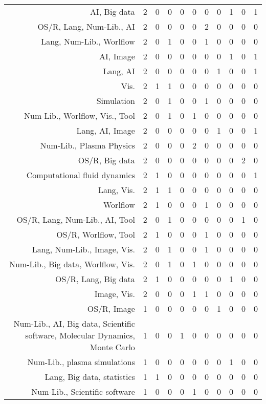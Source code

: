 {\begin{landscape}
\begin{longtable}[htb]{r|c|c|c|c|c|c|c|c|c|c}
{AI, Big data} & 2 & 0 & 0 & 0 & 0 & 0 & 0 & 1 & 0 & 1 \\%
{OS/R, Lang, Num-Lib., AI} & 2 & 0 & 0 & 0 & 0 & 2 & 0 & 0 & 0 & 0 \\%
{Lang, Num-Lib., Worlflow} & 2 & 0 & 1 & 0 & 0 & 1 & 0 & 0 & 0 & 0 \\%
{AI, Image} & 2 & 0 & 0 & 0 & 0 & 0 & 0 & 1 & 0 & 1 \\%
{Lang, AI} & 2 & 0 & 0 & 0 & 0 & 0 & 1 & 0 & 0 & 1 \\%
{Vis.} & 2 & 1 & 1 & 0 & 0 & 0 & 0 & 0 & 0 & 0 \\%
{Simulation} & 2 & 0 & 1 & 0 & 0 & 1 & 0 & 0 & 0 & 0 \\%
{Num-Lib., Worlflow, Vis., Tool} & 2 & 0 & 1 & 0 & 1 & 0 & 0 & 0 & 0 & 0 \\%
{Lang, AI, Image} & 2 & 0 & 0 & 0 & 0 & 0 & 1 & 0 & 0 & 1 \\%
{Num-Lib., Plasma Physics} & 2 & 0 & 0 & 0 & 2 & 0 & 0 & 0 & 0 & 0 \\%
{OS/R, Big data} & 2 & 0 & 0 & 0 & 0 & 0 & 0 & 0 & 2 & 0 \\%
{Computational fluid dynamics} & 2 & 1 & 0 & 0 & 0 & 0 & 0 & 0 & 0 & 1 \\%
{Lang, Vis.} & 2 & 1 & 1 & 0 & 0 & 0 & 0 & 0 & 0 & 0 \\%
{Worlflow} & 2 & 1 & 0 & 0 & 0 & 1 & 0 & 0 & 0 & 0 \\%
{OS/R, Lang, Num-Lib., AI, Tool} & 2 & 0 & 1 & 0 & 0 & 0 & 0 & 0 & 1 & 0 \\%
{OS/R, Worlflow, Tool} & 2 & 1 & 0 & 0 & 0 & 1 & 0 & 0 & 0 & 0 \\%
{Lang, Num-Lib., Image, Vis.} & 2 & 0 & 1 & 0 & 0 & 1 & 0 & 0 & 0 & 0 \\%
{Num-Lib., Big data, Worlflow, Vis.} & 2 & 0 & 1 & 0 & 1 & 0 & 0 & 0 & 0 & 0 \\%
{OS/R, Lang, Big data} & 2 & 1 & 0 & 0 & 0 & 0 & 0 & 1 & 0 & 0 \\%
{Image, Vis.} & 2 & 0 & 0 & 0 & 1 & 1 & 0 & 0 & 0 & 0 \\%
{OS/R, Image} & 1 & 0 & 0 & 0 & 0 & 0 & 1 & 0 & 0 & 0 \\%
{Num-Lib., AI, Big data, Scientific software, Molecular Dynamics, Monte Carlo} & 1 & 0 & 0 & 1 & 0 & 0 & 0 & 0 & 0 & 0 \\%
{Num-Lib., plasma simulations} & 1 & 0 & 0 & 0 & 0 & 0 & 0 & 1 & 0 & 0 \\%
{Lang, Big data, statistics} & 1 & 1 & 0 & 0 & 0 & 0 & 0 & 0 & 0 & 0 \\%
{Num-Lib., Scientific software} & 1 & 0 & 0 & 0 & 1 & 0 & 0 & 0 & 0 & 0 \\%

\end{longtable}
\end{landscape}}
